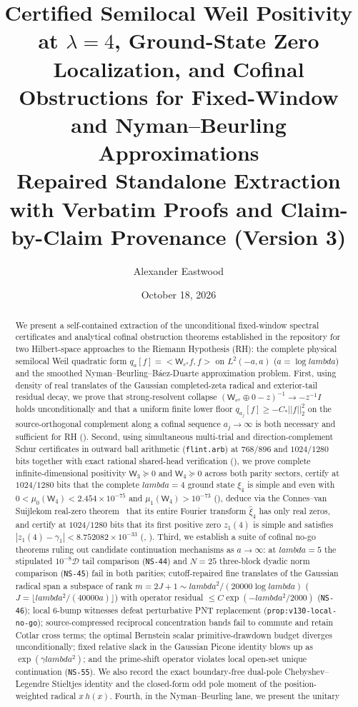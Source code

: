\documentclass[11pt]{article}
\title{\textbf{Certified Semilocal Weil Positivity at $\lambda = 4$, Ground-State Zero Localization, and Cofinal Obstructions for Fixed-Window and Nyman--Beurling Approximations}\\[4pt]
\large Repaired Standalone Extraction with Verbatim Proofs and Claim-by-Claim Provenance (Version 3)}
\author{Alexander Eastwood}
\date{October 18, 2026}
\def\lambda{lambda}%
\def\norm#1{||#1||}%
\def\ip#1#2{<#1,#2>}%
\theoremstyle{remark}
\newcommand{\norm}[1]{\left\lVert #1\right\rVert}
\newcommand{\ip}[2]{\left\langle #1,#2\right\rangle}
\begin{document}
\maketitle

\begin{abstract}
We present a self-contained extraction of the unconditional fixed-window spectral certificates and analytical cofinal obstruction theorems established in the repository  for two Hilbert-space approaches to the Riemann Hypothesis (RH): the complete physical semilocal Weil quadratic form $q_a[f] = \ip{\mathsf W_{e^a} f}{f}$ on $L^2(-a,a)$ ($a = \log\lambda$) and the smoothed Nyman--Beurling--B\'aez-Duarte approximation problem. First, using density of real translates of the Gaussian completed-zeta radical and exterior-tail residual decay, we prove that strong-resolvent collapse $(\mathsf W_{e^a}\oplus 0 - z)^{-1} \to -z^{-1}I$ holds unconditionally and that a uniform finite lower floor $q_{a_j}[f] \ge -C_*\norm{f}_2^2$ on the source-orthogonal complement along a cofinal sequence $a_j \to \infty$ is both necessary and sufficient for RH (). Second, using simultaneous multi-trial and direction-complement Schur certificates in outward ball arithmetic (\texttt{flint.arb}) at $768/896$ and $1024/1280$ bits together with exact rational shared-head verification (), we prove complete infinite-dimensional positivity $\mathsf W_3 \succeq 0$ and $\mathsf W_4 \succeq 0$ across both parity sectors, certify at $1024/1280$ bits that the complete $\lambda = 4$ ground state $\xi_4$ is simple and even with $0 < \mu_0(\mathsf W_4) < 2.454 \times 10^{-75}$ and $\mu_1(\mathsf W_4) > 10^{-73}$ (), deduce via the Connes--van Suijlekom real-zero theorem~\cite{ConnesVanSuijlekom2025} that its entire Fourier transform $\widehat{\xi}_4$ has only real zeros, and certify at $1024/1280$ bits that its first positive zero $z_1(4)$ is simple and satisfies $|z_1(4) - \gamma_1| < 8.752082 \times 10^{-33}$ (, ). Third, we establish a suite of cofinal no-go theorems ruling out candidate continuation mechanisms as $a \to \infty$: at $\lambda = 5$ the stipulated $10^{-8}\mathcal D$ tail comparison (\texttt{NS-44}) and $N = 25$ three-block dyadic norm comparison (\texttt{NS-45}) fail in both parities; cutoff-repaired fine translates of the Gaussian radical span a subspace of rank $m = 2J+1 \sim \lambda^2/(20000\log\lambda)$ ($J = \lfloor\lambda^2/(40000a)\rfloor$) with operator residual $\le C\exp(-\lambda^2/2000)$ (\texttt{NS-46}); local 6-bump witnesses defeat perturbative PNT replacement (\texttt{prop:v130-local-no-go}); source-compressed reciprocal concentration bands fail to commute and retain Cotlar cross terms; the optimal Bernstein scalar primitive-drawdown budget diverges unconditionally; fixed relative slack in the Gaussian Picone identity blows up as $\exp(\gamma\lambda^2)$; and the prime-shift operator violates local open-set unique continuation (\texttt{NS-55}). We also record the exact boundary-free dual-pole Chebyshev--Legendre Stieltjes identity and the closed-form odd pole moment of the position-weighted radical $x\,h(x)$. Fourth, in the Nyman--Beurling lane, we present the unitary 
\end{abstract}
\end{document}
